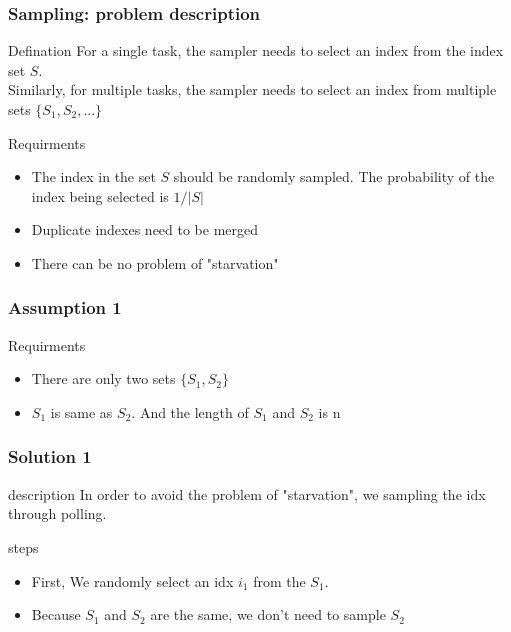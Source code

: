 \documentclass[notheorems, aspectratio=54]{beamer}
\begin{document}
\begin{frame}
    \frametitle{Sampling: problem description}
    \begin{block}{Defination}
        For a single task, the sampler needs to select an index from the index set $S$.\\
        Similarly, for multiple tasks, the sampler needs to select an index from multiple sets $\{S_1, S_2, ...\}$
    \end{block}
    \begin{block}{Requirments}
        \begin{itemize}
            \item The index in the set $S$ should be randomly sampled. The probability of the index being selected is $1/|S|$
            \item Duplicate indexes need to be merged
            \item There can be no problem of "starvation"
        \end{itemize}
    \end{block}
\end{frame}

\begin{frame}
    \frametitle{Assumption 1}
    \begin{block}{Requirments}
        \begin{itemize}
            \item There are only two sets $\{S_1, S_2\}$
            \item $S_1$ is same as $S_2$. And the length of $S_1$ and $S_2$ is n
        \end{itemize}
    \end{block}
\end{frame}

\begin{frame}
    \frametitle{Solution 1}
    \begin{block}{description}
        In order to avoid the problem of "starvation", we sampling the idx through polling. 
    \end{block}
    \begin{block}{steps}
        \begin{itemize}
            \item First, We randomly select an idx $i_1$ from the $S_1$.
            \item Because $S_1$ and $S_2$ are the same, we don't need to sample $S_2$
        \end{itemize}
    \end{block}
\end{frame}
\end{document}
